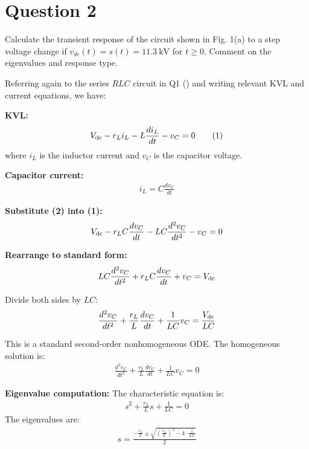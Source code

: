 \clearpage

\section*{Question 2}

Calculate the transient response of the circuit shown in Fig. 1(a) to a step voltage change if $v_{dc}(t) = s(t) = 11.3~\text{kV}$ for $t \geq 0$. Comment on the eigenvalues and response type.

\vspace{1em}
Referring again to the series $RLC$ circuit in Q1 () and writing relevant KVL and current equations, we have:

\vspace{1em}
\textbf{KVL:}
\begin{align}
    V_{\rm dc} - r_L i_L - L \frac{di_L}{dt} - v_C = 0 \tag{1}
\end{align}
where $i_L$ is the inductor current and $v_C$ is the capacitor voltage.

	\textbf{Capacitor current:}
\begin{align}
    i_L = C \frac{dv_C}{dt} \tag{2}
\end{align}

	\textbf{Substitute (2) into (1):}
\begin{align*}
    V_{\rm dc} - r_L C \frac{dv_C}{dt} - L C \frac{d^2 v_C}{dt^2} - v_C = 0
\end{align*}

	\textbf{Rearrange to standard form:}
\begin{align*}
    L C \frac{d^2 v_C}{dt^2} + r_L C \frac{dv_C}{dt} + v_C = V_{\rm dc}
\end{align*}

Divide both sides by $L C$:
\begin{align*}
    \frac{d^2 v_C}{dt^2} + \frac{r_L}{L} \frac{dv_C}{dt} + \frac{1}{L C} v_C = \frac{V_{\rm dc}}{L C}
\end{align*}

This is a standard second-order nonhomogeneous ODE. The homogeneous solution is:
\begin{align*}
    \frac{d^2 v_C}{dt^2} + \frac{r_L}{L} \frac{dv_C}{dt} + \frac{1}{L C} v_C = 0
\end{align*}

	\textbf{Eigenvalue computation:}
The characteristic equation is:
\begin{align*}
    s^2 + \frac{r_L}{L} s + \frac{1}{L C} = 0
\end{align*}
The eigenvalues are:
\begin{align*}
    s = \frac{-\frac{r_L}{L} \pm \sqrt{\left(\frac{r_L}{L}\right)^2 - 4 \cdot \frac{1}{L C}}}{2}
\end{align*}

